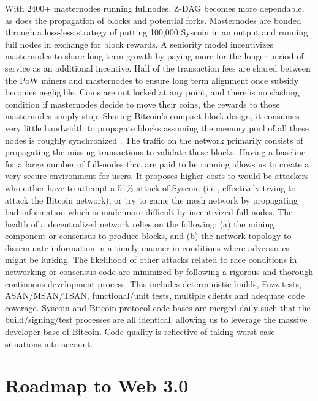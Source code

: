 \documentclass[peerreview]{ieeesyscoin}
\begin{document}
With 2400+ masternodes running fullnodes, Z-DAG becomes more dependable, as does the propagation of blocks and potential forks. Masternodes are bonded through a loss-less strategy of putting 100,000 Syscoin in an output and running full nodes in exchange for block rewards. A seniority model incentivizes masternodes to share long-term growth by paying more for the longer period of service as an additional incentive. Half of the transaction fees are shared between the PoW miners and masternodes to ensure long term alignment once subsidy becomes negligible. Coins are not locked at any point, and there is no slashing condition if masternodes decide to move their coins, the rewards to those masternodes simply stop. Sharing Bitcoin’s compact block design, it consumes very little bandwidth to propagate blocks assuming the memory pool of all these nodes is roughly synchronized \cite{BitCore}. The traffic on the network primarily consists of propagating the missing transactions to validate these blocks. Having a baseline for a large number of full-nodes that are paid to be running allows us to create a very secure environment for users. It proposes higher costs to would-be attackers who either have to attempt a 51\% attack of Syscoin (i.e., effectively trying to attack the Bitcoin network), or try to game the mesh network by propagating bad information which is made more difficult by incentivized full-nodes. The health of a decentralized network relies on the following; (a) the mining component or consensus to produce blocks, and (b) the network topology to disseminate information in a timely manner in conditions where adversaries might be lurking. The likelihood of other attacks related to race conditions in networking or consensus code are minimized by following a rigorous and thorough continuous development process. This includes deterministic builds, Fuzz tests, ASAN/MSAN/TSAN, functional/unit tests, multiple clients and adequate code coverage. Syscoin and Bitcoin protocol code bases are merged daily such that the build/signing/test processes are all identical, allowing us to leverage the massive developer base of Bitcoin.  Code quality is reflective of taking worst case situations into account. 

\section{Roadmap to Web 3.0}
\label{section:roadmap}
\end{document}
